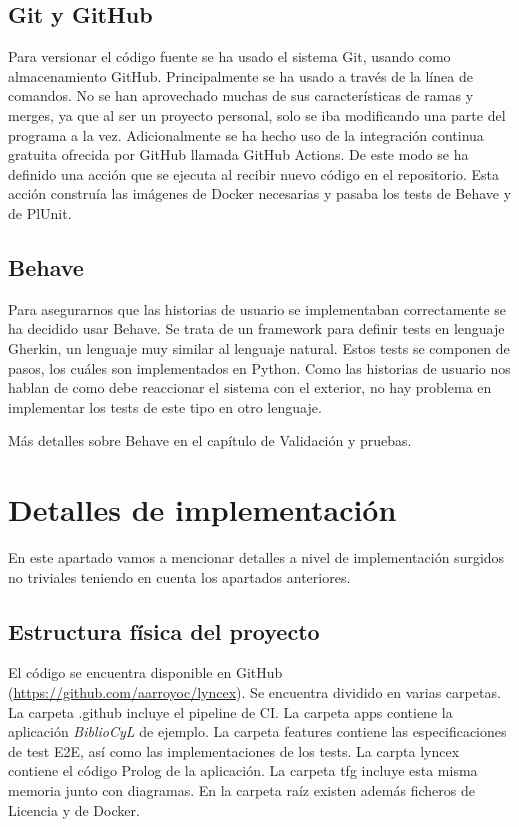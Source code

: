 \documentclass[12pt]{report} %
\begin{document}
\subsection{Git y GitHub}
Para versionar el código fuente se ha usado el sistema Git, usando como almacenamiento GitHub. Principalmente se ha usado a través de la línea de comandos.
No se han aprovechado muchas de sus características de ramas y merges, ya que al ser un proyecto personal, solo se iba modificando una parte del programa a la vez.
Adicionalmente se ha hecho uso de la integración continua gratuita ofrecida por GitHub llamada GitHub Actions. De este modo se ha definido una acción que se ejecuta al recibir nuevo código en el repositorio.
Esta acción construía las imágenes de Docker necesarias y pasaba los tests de Behave y de PlUnit.

\subsection{Behave}
Para asegurarnos que las historias de usuario se implementaban correctamente se ha decidido usar Behave.
Se trata de un framework para definir tests en lenguaje Gherkin, un lenguaje muy similar al lenguaje natural. Estos tests se componen de pasos,
los cuáles son implementados en Python. Como las historias de usuario nos hablan de como debe reaccionar el sistema con el exterior, no hay problema en implementar los tests de este tipo en otro lenguaje.

Más detalles sobre Behave en el capítulo de Validación y pruebas.

\section{Detalles de implementación}

En este apartado vamos a mencionar detalles a nivel de implementación surgidos no triviales teniendo en cuenta los apartados anteriores.

\subsection{Estructura física del proyecto}
El código se encuentra disponible en GitHub (\url{https://github.com/aarroyoc/lyncex}). Se encuentra dividido en varias carpetas. La carpeta .github incluye el pipeline de CI. La carpeta apps contiene la aplicación \textit{BiblioCyL} de ejemplo. La carpeta features contiene las especificaciones de test E2E, así como las implementaciones de los tests. La carpta lyncex contiene el código Prolog de la aplicación. La carpeta tfg incluye esta misma memoria junto con diagramas. En la carpeta raíz existen además ficheros de Licencia y de Docker.
\end{document}
